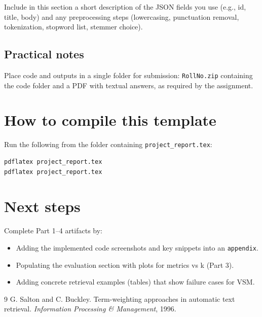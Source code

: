 \documentclass[11pt,a4paper]{article}
\begin{document}
Include in this section a short description of the JSON fields you use (e.g., id,
title, body) and any preprocessing steps (lowercasing, punctuation removal, tokenization,
stopword list, stemmer choice).

\subsection{Practical notes}
Place code and outputs in a single folder for submission: \texttt{RollNo.zip} containing
the code folder and a PDF with textual answers, as required by the assignment.

\section*{How to compile this template}
Run the following from the folder containing \texttt{project_report.tex}:
\begin{verbatim}
pdflatex project_report.tex
pdflatex project_report.tex
\end{verbatim}

\section*{Next steps}
Complete Part 1--4 artifacts by:
\begin{itemize}[noitemsep]
  \item Adding the implemented code screenshots and key snippets into an \texttt{appendix}.
  \item Populating the evaluation section with plots for metrics vs k (Part 3).
  \item Adding concrete retrieval examples (tables) that show failure cases for VSM.
\end{itemize}


\begin{thebibliography}{9}
G. Salton and C. Buckley. Term-weighting approaches in automatic text retrieval.
\emph{Information Processing & Management}, 1996.
\end{thebibliography}
\end{document}
